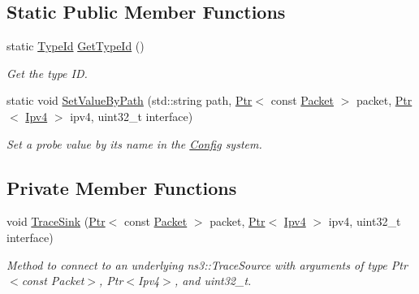 \subsection*{Static Public Member Functions}
\begin{DoxyCompactItemize}
\item 
static \hyperlink{classns3_1_1TypeId}{Type\+Id} \hyperlink{classns3_1_1Ipv4PacketProbe_ad5c77fc289c0f2b3b89454ba3a7b2eb5}{Get\+Type\+Id} ()
\begin{DoxyCompactList}\small\item\em Get the type ID. \end{DoxyCompactList}\item 
static void \hyperlink{classns3_1_1Ipv4PacketProbe_a0fdbd2842cc559a9e8faba36a8a12247}{Set\+Value\+By\+Path} (std\+::string path, \hyperlink{classns3_1_1Ptr}{Ptr}$<$ const \hyperlink{classns3_1_1Packet}{Packet} $>$ packet, \hyperlink{classns3_1_1Ptr}{Ptr}$<$ \hyperlink{classns3_1_1Ipv4}{Ipv4} $>$ ipv4, uint32\+\_\+t interface)
\begin{DoxyCompactList}\small\item\em Set a probe value by its name in the \hyperlink{namespacens3_1_1Config}{Config} system. \end{DoxyCompactList}\end{DoxyCompactItemize}
\subsection*{Private Member Functions}
\begin{DoxyCompactItemize}
\item 
void \hyperlink{classns3_1_1Ipv4PacketProbe_a9ce810cb56c35a6549000618e8436eca}{Trace\+Sink} (\hyperlink{classns3_1_1Ptr}{Ptr}$<$ const \hyperlink{classns3_1_1Packet}{Packet} $>$ packet, \hyperlink{classns3_1_1Ptr}{Ptr}$<$ \hyperlink{classns3_1_1Ipv4}{Ipv4} $>$ ipv4, uint32\+\_\+t interface)
\begin{DoxyCompactList}\small\item\em Method to connect to an underlying ns3\+::\+Trace\+Source with arguments of type Ptr$<$const Packet$>$, Ptr$<$\+Ipv4$>$, and uint32\+\_\+t. \end{DoxyCompactList}\end{DoxyCompactItemize}
